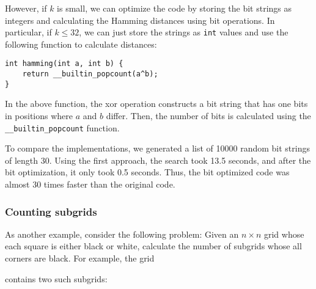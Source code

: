 However, if $k$ is small, we can optimize the code
by storing the bit strings as integers and
calculating the Hamming distances using bit operations.
In particular, if $k \le 32$, we can just store
the strings as \texttt{int} values and use the
following function to calculate distances:
\begin{lstlisting}
int hamming(int a, int b) {
    return __builtin_popcount(a^b);
}
\end{lstlisting}
In the above function, the xor operation constructs
a bit string that has one bits in positions
where $a$ and $b$ differ.
Then, the number of bits is calculated using
the \texttt{\_\_builtin\_popcount} function.

To compare the implementations, we generated
a list of 10000 random bit strings of length 30.
Using the first approach, the search took
13.5 seconds, and after the bit optimization,
it only took 0.5 seconds.
Thus, the bit optimized code was almost
30 times faster than the original code.

\subsubsection{Counting subgrids}

As another example, consider the
following problem:
Given an $n \times n$ grid whose
each square is either black or white,
calculate the number of subgrids
whose all corners are black.
For example, the grid
\begin{center}
\end{center}
contains two such subgrids:
\begin{center}
\end{center}

